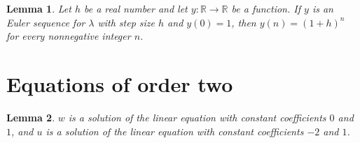 \documentclass{article}
\newtheorem{lemma}{Lemma}
\begin{document}
\begin{lemma}\label{sequence}
Let $h$ be a real number and let $y:\mathbb{R}\to\mathbb{R}$ be a function. If $y$ is an Euler sequence for $\lambda$ with step size $h$ and $y(0)=1$, then $y(n)=(1+h)^n$ for every nonnegative integer $n$.
\end{lemma}

\section{Equations of order two}

\begin{lemma}\label{oscillator}
$w$ is a solution of the linear equation with constant coefficients $0$ and $1$, and $u$ is a solution of the linear equation with constant coefficients $-2$ and $1$.
\end{lemma}
\end{document}
